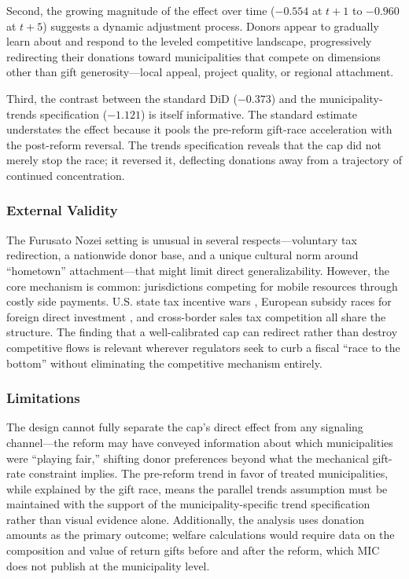 \documentclass[12pt]{article}
\begin{document}
Second, the growing magnitude of the effect over time ($-0.554$ at $t{+}1$ to $-0.960$ at $t{+}5$) suggests a dynamic adjustment process. Donors appear to gradually learn about and respond to the leveled competitive landscape, progressively redirecting their donations toward municipalities that compete on dimensions other than gift generosity---local appeal, project quality, or regional attachment.

Third, the contrast between the standard DiD ($-0.373$) and the municipality-trends specification ($-1.121$) is itself informative. The standard estimate understates the effect because it pools the pre-reform gift-race acceleration with the post-reform reversal. The trends specification reveals that the cap did not merely stop the race; it reversed it, deflecting donations away from a trajectory of continued concentration.

\subsubsection*{External Validity} The Furusato Nozei setting is unusual in several respects---voluntary tax redirection, a nationwide donor base, and a unique cultural norm around ``hometown'' attachment---that might limit direct generalizability. However, the core mechanism is common: jurisdictions competing for mobile resources through costly side payments. U.S. state tax incentive wars \citep{wilson1999theories}, European subsidy races for foreign direct investment \citep{devereux2008tax}, and cross-border sales tax competition \citep{agrawal2015fiscal} all share the structure. The finding that a well-calibrated cap can redirect rather than destroy competitive flows is relevant wherever regulators seek to curb a fiscal ``race to the bottom'' without eliminating the competitive mechanism entirely.

\subsubsection*{Limitations} The design cannot fully separate the cap's direct effect from any signaling channel---the reform may have conveyed information about which municipalities were ``playing fair,'' shifting donor preferences beyond what the mechanical gift-rate constraint implies. The pre-reform trend in favor of treated municipalities, while explained by the gift race, means the parallel trends assumption must be maintained with the support of the municipality-specific trend specification rather than visual evidence alone. Additionally, the analysis uses donation amounts as the primary outcome; welfare calculations would require data on the composition and value of return gifts before and after the reform, which MIC does not publish at the municipality level.
\end{document}

